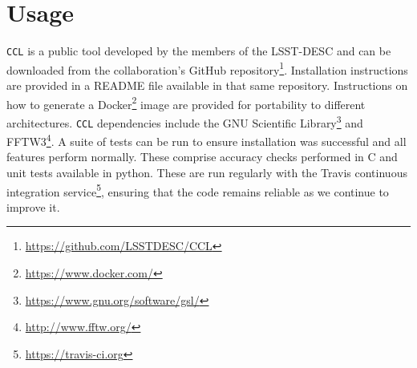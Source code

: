 \documentclass[\docopts]{\docclass}
\newcommand{\elisa}[1]{\textcolor{green!10!orange!90!}{EC: #1}}
\newcommand{\ccl}{{\tt CCL}\xspace}
\begin{document}

\section{Usage}
\label{sec:usage}

\ccl is a public tool developed by the members of the LSST-DESC and can be downloaded from the collaboration's GitHub repository\footnote{\url{https://github.com/LSSTDESC/CCL}}. Installation instructions are provided in a README file available in that same repository. Instructions on how to generate a Docker\footnote{\url{https://www.docker.com/}} image are provided for portability to different architectures. \ccl dependencies include the GNU Scientific Library\footnote{\url{https://www.gnu.org/software/gsl/}} and FFTW3\footnote{\url{http://www.fftw.org/}}. A suite of tests can be run to ensure installation was successful and all features perform normally. These comprise accuracy checks performed in C and unit tests available in python. These are run regularly with the Travis continuous integration service\footnote{\url{https://travis-ci.org}}, ensuring that the code remains reliable as we continue to improve it. 
\end{document}
